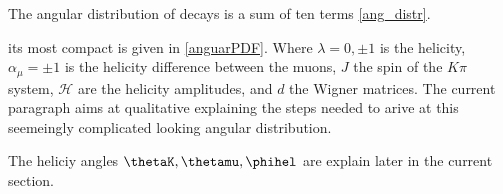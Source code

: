 



The angular distribution of \BsJpsiKst decays is a sum of ten terms \eqref{ang_distr}. 

its most compact is given in \eqref{anguarPDF}. Where $\lambda=0,\pm 1$ is the \Jpsi helicity, $\alpha_{\mu}=\pm1$ is the helicity difference between the muons, 
$J$ the spin of the $K\pi$ system, $\mathcal{H}$ are the helicity amplitudes, and $d$ the Wigner matrices. The current paragraph aims at qualitative explaining the steps needed
to arive at this seemeingly complicated looking angular distribution.  





 The heliciy angles $\thetaK,\thetamu,\phihel$ are explain later in the current section.



